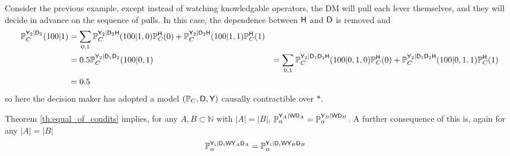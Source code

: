 Consider the previous example, except instead of watching knowledgable operators, the DM will pull each lever themselves, and they will decide in advance on the sequence of pulls. In this case, the dependence between $\mathsf{H}$ and $\mathsf{D}$ is removed and
\begin{align}
        \mathbb{P}_C^{\mathsf{Y}_2|\mathsf{D}_2}(100|1) &= \sum_{0,1} \mathbb{P}_C^{\mathsf{Y}_2|\mathsf{D}_2\mathsf{H}}(100|1,0)\mathbb{P}_C^{\mathsf{H}}(0) + \mathbb{P}_C^{\mathsf{Y}_2|\mathsf{D}_2\mathsf{H}}(100|1,1)\mathbb{P}_C^{\mathsf{H}}(1)\\
        &= 0.5
        \mathbb{P}_C^{\mathsf{Y}_2|\mathsf{D}_1\mathsf{D}_2}(100|0,1) &= \sum_{0,1} \mathbb{P}_C^{\mathsf{Y}_2|\mathsf{D}_1\mathsf{D}_2\mathsf{H}}(100|0,1,0)\mathbb{P}_C^{\mathsf{H}}(0) + \mathbb{P}_C^{\mathsf{Y}_2|\mathsf{D}_1\mathsf{D}_2\mathsf{H}}(100|0,1,1)\mathbb{P}_C^{\mathsf{H}}(1)\\
        &= 0.5
\end{align}
so here the decision maker has adopted a model $(\mathbb{P}_C, \mathsf{D},\mathsf{Y})$ causally contractible over $*$.

Theorem \ref{th:equal_of_condits} implies, for any $A,B\subset\mathbb{N}$ with $|A|=|B|$, $\mathbb{P}_\alpha^{\mathsf{Y}_A|\mathsf{WD}_A}=\mathbb{P}_\alpha^{\mathsf{Y}_B|\mathsf{WD}_B}$. A further consequence of this is, again for any $|A|=|B|$
\begin{align}
    \mathbb{P}_\alpha^{\mathsf{Y}_i|\mathsf{D}_i\mathsf{W}\mathsf{Y}_A\mathsf{D}_A} &= \mathbb{P}_\alpha^{\mathsf{Y}_i|\mathsf{D}_i\mathsf{W}\mathsf{Y}_B\mathsf{D}_B}\label{eq:interchangeability_of_conditioning}
\end{align}

